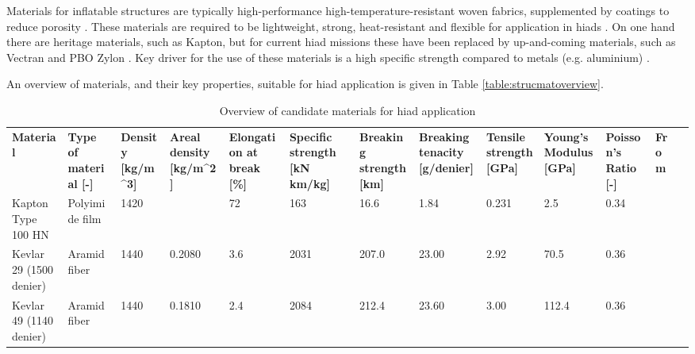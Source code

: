 Materials for inflatable structures are typically high-performance high-temperature-resistant woven fabrics, supplemented by coatings to reduce porosity \cite{Jenkins2001}. These materials are required to be lightweight, strong, heat-resistant and flexible for application in \glspl{hiad} \cite{Samareh2010}. On one hand there are heritage materials, such as Kapton, but for current \gls{hiad} missions these have been replaced by up-and-coming materials, such as Vectran and PBO Zylon \cite{Dillman2012,  Smith2010}. Key driver for the use of these materials is a high specific strength compared to metals (e.g. aluminium) \cite{Samareh2010}. 

An overview of materials, and their key properties, suitable for \gls{hiad} application is given in Table \ref{table:strucmatoverview}. 

\begin{table}[h]
\begin{tabular}{lllllllllllll}
\caption{Overview of candidate materials for \gls{hiad} application}
\textbf{Material}            & \textbf{Type of material {[}-{]}} & \textbf{Density {[}kg/m\textasciicircum 3{]}} & \textbf{Areal density {[}kg/m\textasciicircum 2{]}} & \textbf{Elongation at break {[}\%{]}} & \textbf{Specific strength {[}kN km/kg{]}} & \textbf{Breaking strength {[}km{]}} & \textbf{Breaking tenacity {[}g/denier{]}} & \textbf{Tensile strength {[}GPa{]}} & \textbf{Young's Modulus {[}GPa{]}} & \textbf{Poisson's Ratio {[}-{]}} & \textbf{From} &  \\
Kapton Type 100 HN           & Polyimide film                    & 1420                                          &                                                     & 72                                    & 163                                       & 16.6                                & 1.84                                      & 0.231                               & 2.5                                & 0.34                             &               &  \\
Kevlar 29 (1500 denier)      & Aramid fiber                      & 1440                                          & 0.2080                                              & 3.6                                   & 2031                                      & 207.0                               & 23.00                                     & 2.92                                & 70.5                               & 0.36                             &               &  \\
Kevlar 49 (1140 denier)      & Aramid fiber                      & 1440                                          & 0.1810                                              & 2.4                                   & 2084                                      & 212.4                               & 23.60                                     & 3.00                                & 112.4                              & 0.36                             &               &  \\

\end{tabular}
\end{table}
